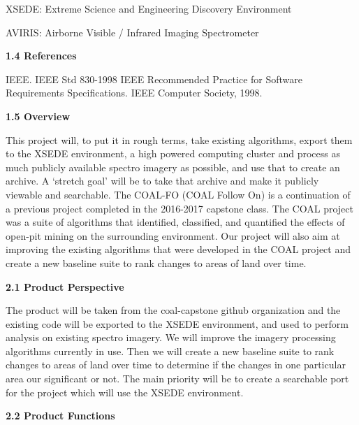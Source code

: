 \documentclass[a4paper,12pt]{article}
\begin{document}
\noindent XSEDE: Extreme Science and Engineering Discovery Environment\newline


\noindent AVIRIS: Airborne Visible / Infrared Imaging Spectrometer\newline


\noindent \textbf{1.4 References}\newline

IEEE. IEEE Std 830-1998 IEEE Recommended Practice for Software Requirements Specifications. IEEE Computer Society, 1998.\newline


\noindent \textbf{1.5 Overview}\newline


\noindent This project will, to put it in rough terms, take existing algorithms, export them to the XSEDE environment, a high powered computing cluster and process as much publicly available spectro imagery as possible, and use that to create an archive. A ‘stretch goal’ will be to take that archive and make it publicly viewable and searchable. The COAL-FO (COAL Follow On) is a continuation of a previous project completed in the 2016-2017 capstone class. The COAL project was a suite of algorithms that identified, classified, and quantified the effects of open-pit mining on the surrounding environment. Our project will also aim at improving the existing algorithms that were developed in the COAL project and create a new baseline suite to rank changes to areas of land over time. \newline


\newline


\noindent \textbf{2.1 Product Perspective}\newline


\noindent The product will be taken from the coal-capstone github organization and the existing code will be exported to the XSEDE environment, and used to perform analysis on existing spectro imagery. We will improve the imagery processing algorithms currently in use. Then we will create a new baseline suite to rank changes to areas of land over time to determine if the changes in one particular area our significant or not. The main priority will be to create a searchable port for the project which will use the XSEDE environment. \newline


\noindent \textbf{2.2 Product Functions}\newline
\end{document}
